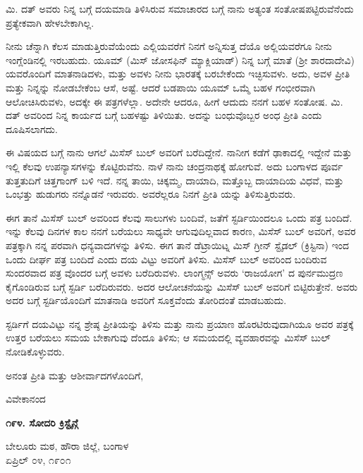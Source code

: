 ಮಿ. ದತ್ ಅವರು ನಿನ್ನ ಬಗ್ಗೆ ದಯಮಾಡಿ ತಿಳಿಸಿರುವ ಸಮಾಚಾರದ ಬಗ್ಗೆ ನಾನು ಅತ್ಯಂತ ಸಂತೋಷಪಟ್ಟಿರುವೆನೆಂದು ಪ್ರತ್ಯೇಕವಾಗಿ ಹೇಳಬೇಕಾಗಿಲ್ಲ.

ನೀನು ಚೆನ್ನಾಗಿ ಕೆಲಸ ಮಾಡುತ್ತಿರುವೆಯೆಂದು ಎಲ್ಲಿಯವರೆಗೆ ನಿನಗೆ ಅನ್ನಿಸುತ್ತ ದೆಯೊ ಅಲ್ಲಿಯವರೆಗೂ ನೀನು ಇಂಗ್ಲೆಂಡಿನಲ್ಲಿ ಇರಬಹುದು. ಯೂಮ್​ (ಮಿಸ್ ಜೋಸಫಿನ್ ಮ್ಯಾಕ್ಲಿಯಾಡ್) ನಿನ್ನ ಬಗ್ಗೆ ಮಾತೆ (ಶ‍್ರೀ ಶಾರದಾದೇವಿ) ಯವರೊಂದಿಗೆ ಮಾತನಾಡಿದಳು, ಮತ್ತು ಅವಳು ನೀನು ಭಾರತಕ್ಕೆ ಬರಬೇಕೆಂದು ಇಚ್ಛಿಸುವಳು. ಅದು, ಅವಳ ಪ್ರೀತಿ ಮತ್ತು ನಿನ್ನನ್ನು ನೋಡಬೇಕೆಂಬ ಆಸೆ, ಅಷ್ಟೆ. ಆದರೆ ಬಡಪಾಯಿ ಯೂಮ್​ ಒಮ್ಮೆ ಬಹಳ ಗಂಭೀರವಾಗಿ ಆಲೋಚಿಸಿರುವಳು, ಅದಕ್ಕೇ ಈ ಪತ್ರಗಳೆಲ್ಲಾ. ಅದೇನೇ ಆದರೂ, ಹೀಗೆ ಆದುದು ನನಗೆ ಬಹಳ ಸಂತೋಷ. ಮಿ. ದತ್ ಅವರಿಂದ ನಿನ್ನ ಕಾರ್ಯದ ಬಗ್ಗೆ ಬಹಳಷ್ಟು ತಿಳಿಯಿತು. ಅದನ್ನು ಬಂಧುವೊಬ್ಬರ ಅಂಧ ಪ್ರೀತಿ ಎಂದು ದೂಷಿಸಲಾಗದು.

ಈ ವಿಷಯದ ಬಗ್ಗೆ ನಾನು ಆಗಲೆ ಮಿಸೆಸ್ ಬುಲ್ ಅವರಿಗೆ ಬರೆದಿದ್ದೇನೆ. ನಾನೀಗ ಕಡೆಗೆ ಢಾಕಾದಲ್ಲಿ ಇದ್ದೇನೆ ಮತ್ತು ಇಲ್ಲಿ ಕೆಲವು ಉಪನ್ಯಾಸಗಳನ್ನು ಕೊಟ್ಟಿರುವೆನು. ನಾಳೆ ನಾನು ಚಂದ್ರನಾಥಕ್ಕೆ ಹೋಗುವೆ. ಅದು ಬಂಗಾಳದ ಪೂರ್ವ ತುತ್ತತುದಿಗೆ ಚಿತ್ತಗಾಂಗ್ ಬಳಿ ಇದೆ. ನನ್ನ ತಾಯಿ, ಚಿಕ್ಕಮ್ಮ, ದಾಯಾದಿ, ಮತ್ತೊಬ್ಬ ದಾಯಾದಿಯ ವಿಧವೆ, ಮತ್ತು ಒಂಭತ್ತು ಹುಡುಗರು ನನ್ನೊಡನೆ ಇರುವರು. ಅವರೆಲ್ಲರೂ ನಿನಗೆ ಪ್ರೀತಿ ಯನ್ನು ತಿಳಿಸುತ್ತಿರುವರು.

ಈಗ ತಾನೆ ಮಿಸೆಸ್ ಬುಲ್ ಅವರಿಂದ ಕೆಲವು ಸಾಲುಗಳು ಬಂದಿವೆ, ಜತೆಗೆ ಸ್ಟರ್ಡಿಯಿಂದಲೂ ಒಂದು ಪತ್ರ ಬಂದಿದೆ. ಇನ್ನು ಕೆಲವು ದಿನಗಳ ಕಾಲ ನನಗೆ ಬರೆಯಲು ಸಾಧ್ಯವೇ ಆಗುವುದಿಲ್ಲವಾದ ಕಾರಣ, ಮಿಸೆಸ್ ಬುಲ್ ಅವರಿಗೆ, ಅವರ ಪತ್ರಕ್ಕಾಗಿ ನನ್ನ ಪರವಾಗಿ ಧನ್ಯವಾದಗಳನ್ನು ತಿಳಿಸು. ಈಗ ತಾನೆ ಡೆಟ್ರಾಯಿಟ್ನ ಮಿಸ್ ಗ್ರೀನ್ ಸ್ಟೈಡಲ್ (ಕ್ರಿಸ್ಟಿನಾ) ಇಂದ ಒಂದು ದೀರ್ಘ ಪತ್ರ ಬಂದಿದೆ ಎಂದು ದಯ ವಿಟ್ಟು ಅವರಿಗೆ ತಿಳಿಸು. ಮಿಸೆಸ್ ಬುಲ್ ಅವರಿಂದ ಬಂದಿರುವ ಸುಂದರವಾದ ಪತ್ರ ವೊಂದರ ಬಗ್ಗೆ ಅವಳು ಬರೆದಿರುವಳು. ಲಾಂಗ್ಮನ್ಸ್ ಅವರು ‘ರಾಜಯೋಗ’ ದ ಪುರ್ನಮುದ್ರಣ ಕೈಗೊಂಡಿರುವ ಬಗ್ಗೆ ಸ್ಟರ್ಡಿ ಬರೆದಿರುವರು. ಅದರ ಆಲೋಚನೆಯನ್ನು ಮಿಸೆಸ್ ಬುಲ್ ಅವರಿಗೆ ಬಿಟ್ಟಿರುತ್ತೇನೆ. ಅವರು ಅದರ ಬಗ್ಗೆ ಸ್ಟರ್ಡಿಯೊಂದಿಗೆ ಮಾತನಾಡಿ ಅವರಿಗೆ ಸೂಕ್ತವೆಂದು ತೋರಿದಂತೆ ಮಾಡಬಹುದು.

ಸ್ಟರ್ಡಿಗೆ ದಯವಿಟ್ಟು ನನ್ನ ಶ್ರೇಷ್ಠ ಪ್ರೀತಿಯನ್ನು ತಿಳಿಸು ಮತ್ತು ನಾನು ಪ್ರಯಾಣ ಹೊರಟಿರುವುದಾಗಿಯೂ ಅವರ ಪತ್ರಕ್ಕೆ ಉತ್ತರ ಬರೆಯಲು ಸಮಯ ಬೇಕಾಗುವು ದೆಂದೂ ತಿಳಿಸು; ಆ ಸಮಯದಲ್ಲಿ ವ್ಯವಹಾರವನ್ನು ಮಿಸೆಸ್ ಬುಲ್ ನೋಡಿಕೊಳ್ಳುವರು.

ಅನಂತ ಪ್ರೀತಿ ಮತ್ತು ಆಶೀರ್ವಾದಗಳೊಂದಿಗೆ,

\begin{flushright}
ವಿವೇಕಾನಂದ
\end{flushright}

\begin{center}
\textbf{೧೯೪. ಸೋದರಿ ಕ್ರಿಸ್ಟೈನ್ಗೆ}
\end{center}

\begin{flushright}
ಬೇಲೂರು ಮಠ, ಹೌರಾ ಜಿಲ್ಲೆ, ಬಂಗಾಳ\\ಏಪ್ರಿಲ್ ೦೪, ೧೯೦೧
\end{flushright}

